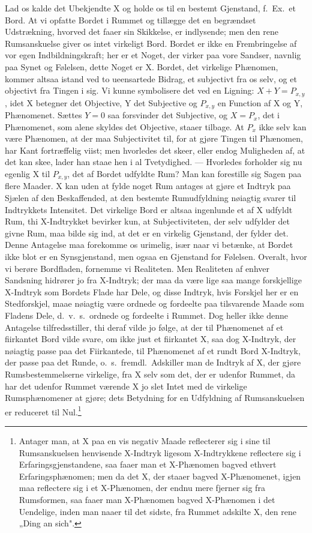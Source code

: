\documentclass[12pt]{article}
\newcommand{\opage}[1]{\marginnote{\footnotesize\textit{[#1]}}}
\begin{document}
Lad os kalde det Ubekjendte X og holde os til en bestemt
Gjenstand, f.\ Ex.\ et Bord. At vi opfatte Bordet i Rummet og
tillægge det en begrændset Udstrækning, hvorved det faaer sin
Skikkelse, er indlysende; men den rene Rumsanskuelse giver
\opage{10} os intet virkeligt Bord. Bordet er ikke en Frembringelse af
vor egen Indbildningskraft; her er et Noget, der virker paa
vore Sandser, navnlig paa Synet og Følelsen, dette Noget er X.
Bordet, det virkelige Phænomen, kommer altsaa istand ved to
ueensartede Bidrag, et subjectivt fra os selv, og et objectivt fra
Tingen i sig. Vi kunne symbolisere det ved en Ligning:
$X + Y = P_{x,y}$, idet X betegner det Objective, Y det Subjective
og $P_{x,y}$ en Function af X og Y, Phænomenet. Sættes $Y = 0$
saa forsvinder det Subjective, og $X = P_x$, det i Phænomenet,
som alene skyldes det Objective, staaer tilbage. At $P_x$ ikke
selv kan være Phænomen, at der maa Subjectivitet til, for
at gjøre Tingen til Phænomen, har Kant fortræffelig viist; men
hvorledes det skeer, eller endog Muligheden af, at det kan skee,
lader han staae hen i al Tvetydighed. --- Hvorledes forholder sig
nu egenlig X til $P_{x,y}$, det af Bordet udfyldte Rum? Man kan
forestille sig Sagen paa flere Maader. X kan uden at fylde
noget Rum antages at gjøre et Indtryk paa Sjælen af den
Beskaffended, at den bestemte Rumudfyldning nøiagtig svarer til
Indtrykkets Intensitet. Det virkelige Bord er altsaa ingenlunde
et af X udfyldt Rum, thi X-Indtrykket bevirker kun, at
Subjectiviteten, der selv udfylder det givne Rum, maa bilde sig
ind, at det er en virkelig Gjenstand, der fylder det. Denne
Antagelse maa forekomme os urimelig, især naar vi betænke, at
Bordet ikke blot er en Synsgjenstand, men ogsaa en Gjenstand
for Følelsen. Overalt, hvor vi berøre Bordfladen, fornemme vi
Realiteten. Men Realiteten af enhver Sandsning hidrører jo
fra X-Indtryk; der maa da være lige saa mange forskjellige
X-Indtryk som Bordets Flade har Dele, og disse Indtryk,
hvis Forskjel her er en Stedforskjel, maae nøiagtig være
ordnede og fordeelte paa tilsvarende Maade som Fladens Dele,
d.\ v.\ s.\ ordnede og fordeelte i Rummet. Dog heller ikke denne
Antagelse tilfredsstiller, thi deraf vilde jo følge, at der til
Phænomenet af et fiirkantet Bord vilde svare, om ikke just et
fiirkantet X, saa dog X-Indtryk, der nøiagtig passe paa det
Fiirkantede, til Phænomenet af et rundt Bord X-Indtryk,
der passe paa det Runde, o.\ s.\ fremdl.\ Adskiller man de Ind\-tryk
\opage{11} af X, der gjøre Rumsbestemmelserne virkelige, fra X selv
som det, der er udenfor Rummet, da har det udenfor Rummet
værende X jo slet Intet med de virkelige Rumsphænomener at
gjøre; dets Betydning for en Udfyldning af Rumsanskuelsen er
reduceret til Nul.\footnote{%
Antager man, at X paa en vis negativ Maade reflecterer sig i sine til
Rumsanskuelsen henvisende X-Indtryk ligesom X-Indtrykkene reflectere
sig i Erfaringsgjenstandene, saa faaer man et X-Phænomen bagved ethvert
Erfaringsphænomen; men da det X, der staaer bagved X-Phænomenet,
igjen maa reflectere sig i et X-Phænomen, der endnu mere fjerner sig
fra Rumsformen, saa faaer man X-Phænomen bagved X-Phænomen i det
Uendelige, inden man naaer til det sidste, fra Rummet adskilte X, den
rene „Ding an sich".}
\end{document}
